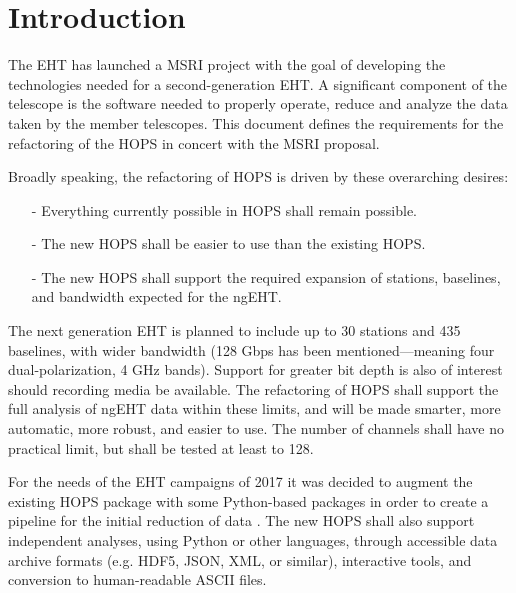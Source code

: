 %
%

\section{Introduction}
\label{sec:intro}

The \ac{EHT} has launched a \ac{MSRI} project with the goal of developing
the technologies needed for a second-generation \acs{EHT}. 
A significant component of the telescope is the software needed to 
properly operate, reduce and analyze the data taken by the member telescopes.
This document defines the requirements for the refactoring of the \ac{HOPS} in 
concert with the \acs{MSRI} proposal. 

Broadly speaking, the refactoring of \acs{HOPS} is driven by
these overarching desires:

\begin{itemize}
\item[-] Everything currently possible in \ac{HOPS} shall remain possible.

\item[-] The new \ac{HOPS} shall be easier to use than the existing \acs{HOPS}.
 
\item[-] The new \acs{HOPS} shall support the required expansion of stations, 
baselines, and bandwidth expected for the ngEHT.

\end{itemize}

The next generation \acs{EHT} is planned to include up to 30 stations
and 435 baselines, with wider bandwidth (128 Gbps has been mentioned---meaning
four dual-polarization, 4 GHz bands). Support for greater bit depth is
also of interest should recording media be available.  The refactoring
of \ac{HOPS} shall support the full analysis of ngEHT data within these limits,
and will be made smarter, more automatic, more robust, and easier to use. The
number of channels shall have no practical limit, but shall be tested at least to 128.


For the needs of the \acs{EHT} campaigns of 2017 it was decided to augment
the existing HOPS package with some Python-based packages in order to
create a pipeline for the initial reduction of data \cite{blackburn2019eht}.
The new \ac{HOPS} shall also
support independent analyses, using Python or other languages, through
accessible data archive formats (e.g. HDF5, JSON, XML, or similar), interactive 
tools, and conversion to human-readable ASCII files. 

